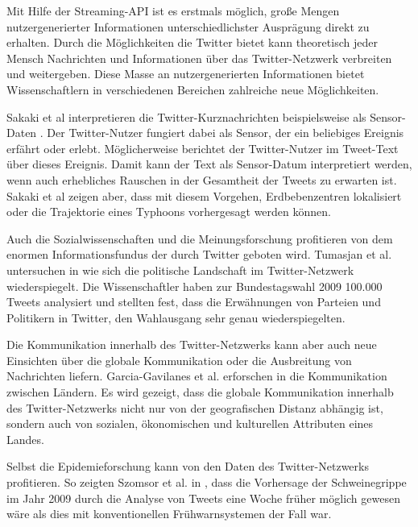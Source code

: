 		Mit Hilfe der Streaming-API ist es erstmals möglich, große Mengen nutzergenerierter Informationen unterschiedlichster Ausprägung direkt zu erhalten. 
		Durch die Möglichkeiten die Twitter bietet kann theoretisch jeder Mensch Nachrichten und Informationen über das Twitter-Netzwerk verbreiten und weitergeben. 
		Diese Masse an nutzergenerierten Informationen bietet Wissenschaftlern in verschiedenen Bereichen zahlreiche neue Möglichkeiten.

		Sakaki et al interpretieren die Twitter-Kurznachrichten beispielsweise als Sensor-Daten \cite{Sakaki2010}.
		Der Twitter-Nutzer fungiert dabei als Sensor, der ein beliebiges Ereignis erfährt oder erlebt.
		Möglicherweise berichtet der Twitter-Nutzer im Tweet-Text über dieses Ereignis. 
		Damit kann der Text als Sensor-Datum interpretiert werden, wenn auch erhebliches Rauschen in der Gesamtheit der Tweets zu erwarten ist.    
		Sakaki et al zeigen aber, dass mit diesem Vorgehen, Erdbebenzentren lokalisiert oder die Trajektorie eines Typhoons vorhergesagt werden können.   
		
		Auch die Sozialwissenschaften und die Meinungsforschung profitieren von dem enormen Informationsfundus der durch Twitter geboten wird.  
		Tumasjan et al. untersuchen in \cite{Tumasjan2011} wie sich die politische Landschaft im Twitter-Netzwerk wiederspiegelt. 
		Die Wissenschaftler haben zur Bundestagswahl 2009 100.000 Tweets analysiert und stellten fest, dass die Erwähnungen von Parteien und Politikern in Twitter, den Wahlausgang sehr genau wiederspiegelten.  
		
		Die Kommunikation innerhalb des Twitter-Netzwerks kann aber auch neue Einsichten über die globale Kommunikation oder die Ausbreitung von Nachrichten liefern.
		Garcia-Gavilanes et al. erforschen in \cite{Garcia-Gavilanes2014} die Kommunikation zwischen Ländern. 
		Es wird gezeigt, dass die globale Kommunikation innerhalb des Twitter-Netzwerks nicht nur von der geografischen Distanz abhängig ist, sondern auch von sozialen, ökonomischen und kulturellen Attributen eines Landes.   

		Selbst die Epidemieforschung kann von den Daten des Twitter-Netzwerks profitieren. 
		So zeigten Szomsor et al. in \cite{Szomszor2011}, dass die Vorhersage der Schweinegrippe im Jahr 2009 durch die Analyse von Tweets eine Woche früher möglich gewesen wäre als dies mit konventionellen Frühwarnsystemen der Fall war. 

